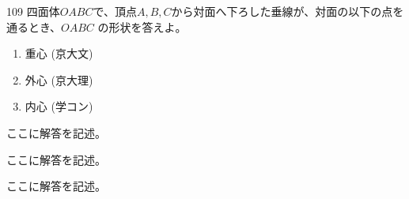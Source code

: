 \begin{prob}{109}{}{}
 四面体$OABC$で、頂点$A, B, C$から対面へ下ろした垂線が、対面の以下の点を通るとき、$OABC$ の形状を答えよ。
 \begin{enumerate}
  \item 重心  (京大文)
  \item 外心  (京大理)
  \item 内心  (学コン)
 \end{enumerate}
\end{prob}
ここに解答を記述。

ここに解答を記述。

ここに解答を記述。